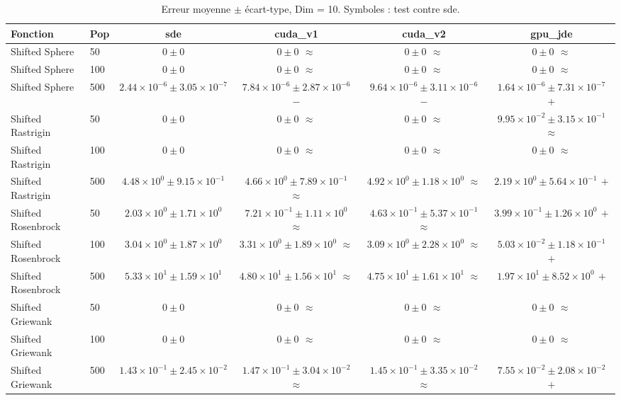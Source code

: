 \begin{table}[t]
\centering
\caption{Erreur moyenne $\pm$ écart-type, Dim = 10. Symboles : test contre sde.}
\label{tab:quality_d10}
\scriptsize
\begin{tabular}{llcccc}
\toprule
Fonction & Pop & sde & cuda\_v1 & cuda\_v2 & gpu\_jde \\
\midrule
Shifted Sphere & 50 & \textbf{$0\pm0$} & \textbf{$0\pm0$ $\approx$} & \textbf{$0\pm0$ $\approx$} & \textbf{$0\pm0$ $\approx$} \\
Shifted Sphere & 100 & \textbf{$0\pm0$} & \textbf{$0\pm0$ $\approx$} & \textbf{$0\pm0$ $\approx$} & \textbf{$0\pm0$ $\approx$} \\
Shifted Sphere & 500 & $2.44\times10^{-6}\pm3.05\times10^{-7}$ & $7.84\times10^{-6}\pm2.87\times10^{-6}$ $-$ & $9.64\times10^{-6}\pm3.11\times10^{-6}$ $-$ & \textbf{$1.64\times10^{-6}\pm7.31\times10^{-7}$ $+$} \\
Shifted Rastrigin & 50 & \textbf{$0\pm0$} & \textbf{$0\pm0$ $\approx$} & \textbf{$0\pm0$ $\approx$} & $9.95\times10^{-2}\pm3.15\times10^{-1}$ $\approx$ \\
Shifted Rastrigin & 100 & \textbf{$0\pm0$} & \textbf{$0\pm0$ $\approx$} & \textbf{$0\pm0$ $\approx$} & \textbf{$0\pm0$ $\approx$} \\
Shifted Rastrigin & 500 & $4.48\times10^{0}\pm9.15\times10^{-1}$ & $4.66\times10^{0}\pm7.89\times10^{-1}$ $\approx$ & $4.92\times10^{0}\pm1.18\times10^{0}$ $\approx$ & \textbf{$2.19\times10^{0}\pm5.64\times10^{-1}$ $+$} \\
Shifted Rosenbrock & 50 & $2.03\times10^{0}\pm1.71\times10^{0}$ & $7.21\times10^{-1}\pm1.11\times10^{0}$ $\approx$ & $4.63\times10^{-1}\pm5.37\times10^{-1}$ $\approx$ & \textbf{$3.99\times10^{-1}\pm1.26\times10^{0}$ $+$} \\
Shifted Rosenbrock & 100 & $3.04\times10^{0}\pm1.87\times10^{0}$ & $3.31\times10^{0}\pm1.89\times10^{0}$ $\approx$ & $3.09\times10^{0}\pm2.28\times10^{0}$ $\approx$ & \textbf{$5.03\times10^{-2}\pm1.18\times10^{-1}$ $+$} \\
Shifted Rosenbrock & 500 & $5.33\times10^{1}\pm1.59\times10^{1}$ & $4.80\times10^{1}\pm1.56\times10^{1}$ $\approx$ & $4.75\times10^{1}\pm1.61\times10^{1}$ $\approx$ & \textbf{$1.97\times10^{1}\pm8.52\times10^{0}$ $+$} \\
Shifted Griewank & 50 & \textbf{$0\pm0$} & \textbf{$0\pm0$ $\approx$} & \textbf{$0\pm0$ $\approx$} & \textbf{$0\pm0$ $\approx$} \\
Shifted Griewank & 100 & \textbf{$0\pm0$} & \textbf{$0\pm0$ $\approx$} & \textbf{$0\pm0$ $\approx$} & \textbf{$0\pm0$ $\approx$} \\
Shifted Griewank & 500 & $1.43\times10^{-1}\pm2.45\times10^{-2}$ & $1.47\times10^{-1}\pm3.04\times10^{-2}$ $\approx$ & $1.45\times10^{-1}\pm3.35\times10^{-2}$ $\approx$ & \textbf{$7.55\times10^{-2}\pm2.08\times10^{-2}$ $+$} \\
\bottomrule
\end{tabular}
\end{table}
